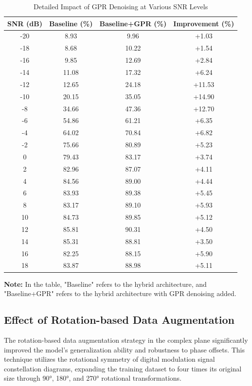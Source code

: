 \documentclass[conference]{IEEEtran}
\begin{document}
\begin{table}[!htbp]
\centering
\caption{Detailed Impact of GPR Denoising at Various SNR Levels}
\label{tab:gpr_detailed_snr}
\begin{tabular}{@{}cccc@{}}
\toprule
SNR (dB) & Baseline (\%) & Baseline+GPR (\%) & Improvement (\%) \\
\midrule
-20 & 8.93 & 9.96 & +1.03 \\
-18 & 8.68 & 10.22 & +1.54 \\
-16 & 9.85 & 12.69 & +2.84 \\
-14 & 11.08 & 17.32 & +6.24 \\
-12 & 12.65 & 24.18 & +11.53 \\
-10 & 20.15 & 35.05 & +14.90 \\
-8 & 34.66 & 47.36 & +12.70 \\
-6 & 54.86 & 61.21 & +6.35 \\
-4 & 64.02 & 70.84 & +6.82 \\
-2 & 75.66 & 80.89 & +5.23 \\
0 & 79.43 & 83.17 & +3.74 \\
2 & 82.96 & 87.07 & +4.11 \\
4 & 84.56 & 89.00 & +4.44 \\
6 & 83.93 & 89.38 & +5.45 \\
8 & 83.17 & 89.10 & +5.93 \\
10 & 84.73 & 89.85 & +5.12 \\
12 & 85.81 & 90.31 & +4.50 \\
14 & 85.31 & 88.81 & +3.50 \\
16 & 82.25 & 88.15 & +5.90 \\
18 & 83.87 & 88.98 & +5.11 \\
\bottomrule
\end{tabular}
\end{table}

\textbf{Note:} In the table, "Baseline" refers to the hybrid architecture, and "Baseline+GPR" refers to the hybrid architecture with GPR denoising added.

\subsection{Effect of Rotation-based Data Augmentation}

The rotation-based data augmentation strategy in the complex plane significantly improved the model's generalization ability and robustness to phase offsets. This technique utilizes the rotational symmetry of digital modulation signal constellation diagrams, expanding the training dataset to four times its original size through 90°, 180°, and 270° rotational transformations.
\end{document}
